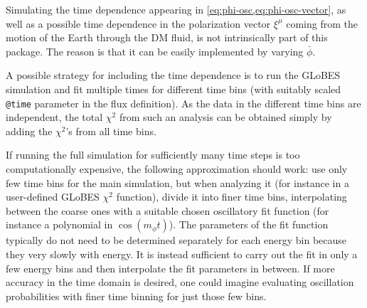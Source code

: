 \documentclass{scrartcl}
\begin{document}
Simulating the time dependence appearing in \cref{eq:phi-osc,eq:phi-osc-vector},
as well as a possible time dependence in the polarization vector $\xi^\mu$
coming from the motion of the Earth through the DM fluid, is not intrinsically
part of this package.  The reason is that it can be easily implemented by
varying $\bar\phi$.

A possible strategy for including the time dependence is to run the GLoBES
simulation and fit multiple times for different time bins (with suitably
scaled {\tt @time} parameter in the flux definition). As the data in
the different time bins are independent, the total $\chi^2$ from such an
analysis can be obtained simply by adding the $\chi^2$'s from all time bins.

If running the full simulation for sufficiently many time steps is too
computationally expensive, the following approximation should work: use
only few time bins for the main simulation, but when analyzing it (for
instance in a user-defined GLoBES $\chi^2$ function), divide it into
finer time bins, interpolating between the coarse ones with a suitable
chosen oscillatory fit function (for instance a polynomial in $\cos(m_\phi t)$).
The parameters of the fit function typically do not need to be determined
separately for each energy bin because they very slowly with energy.  It
is instead sufficient to carry out the fit in only a few energy bins
and then interpolate the fit parameters in between.  If more accuracy in
the time domain is desired, one could imagine evaluating oscillation
probabilities with finer time binning for just those few bins.




\end{document}
